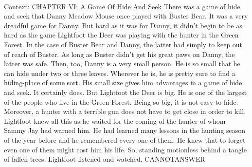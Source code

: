 \documentclass[11pt,a4paper, onecolumn]{article}
\begin{document}
\\ Context: CHAPTER VI: A Game Of Hide And Seek There was a game of hide and seek that Danny Meadow Mouse once played with Buster Bear. It was a very dreadful game for Danny. But hard as it was for Danny, it didn't begin to be as hard as the game Lightfoot the Deer was playing with the hunter in the Green Forest. In the case of Buster Bear and Danny, the latter had simply to keep out of reach of Buster. As long as Buster didn't get his great paws on Danny, the latter was safe. Then, too, Danny is a very small person. He is so small that he can hide under two or three leaves. Wherever he is, he is pretty sure to find a hiding-place of some sort. His small size gives him advantages in a game of hide and seek. It certainly does. But Lightfoot the Deer is big. He is one of the largest of the people who live in the Green Forest. Being so big, it is not easy to hide. Moreover, a hunter with a terrible gun does not have to get close in order to kill. Lightfoot knew all this as he waited for the coming of the hunter of whom Sammy Jay had warned him. He had learned many lessons in the hunting season of the year before and he remembered every one of them. He knew that to forget even one of them might cost him his life. So, standing motionless behind a tangle of fallen trees, Lightfoot listened and watched. CANNOTANSWER
\end{document}
